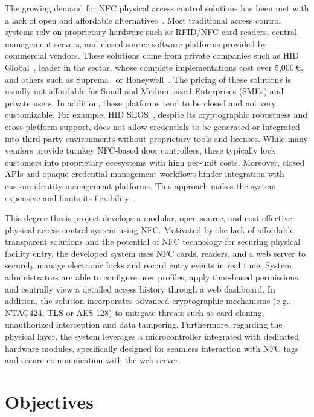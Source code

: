The growing demand for NFC physical access control solutions has been met with a lack of open and affordable alternatives~\cite{Ref3}. Most traditional access control systems rely on proprietary hardware such as RFID/NFC card readers, central management servers, and closed-source software platforms provided by commercial vendors. These solutions come from private companies such as HID Global~\cite{Ref4}, leader in the sector, whose complete implementations cost over 5,000\,€, and others such as Suprema~\cite{Ref5} or Honeywell~\cite{Ref6}. The pricing of these solutions is usually not affordable for Small and Medium-sized Enterprises (SMEs) and private users. In addition, these platforms tend to be closed and not very customizable. For example, HID SEOS\textregistered~\cite{Ref7}, despite its cryptographic robustness and cross-platform support, does not allow credentials to be generated or integrated into third-party environments without proprietary tools and licenses. While many vendors provide turnkey NFC‑based door controllers, these typically lock customers into proprietary ecosystems with high per‑unit costs. Moreover, closed APIs and opaque credential‑management workflows hinder integration with custom identity‑management platforms. This approach makes the system expensive and limits its flexibility~\cite{Ref74}.

This degree thesis project develops a modular, open-source, and cost-effective physical access control system using NFC. Motivated by the lack of affordable transparent solutions and the potential of NFC technology for securing physical facility entry, the developed system uses NFC cards, readers, and a web server to securely manage electronic locks and record entry events in real time. System administrators are able to configure user profiles, apply time-based permissions and centrally view a detailed access history through a web dashboard. In addition, the solution incorporates advanced cryptographic mechanisms (e.g., NTAG424, TLS or AES-128) to mitigate threats such as card cloning, unauthorized interception and data tampering. Furthermore, regarding the physical layer, the system leverages a microcontroller integrated with dedicated hardware modules, specifically designed for seamless interaction with NFC tags and secure communication with the web server.

\clearpage
\section{Objectives}
\label{sec:objectives}


